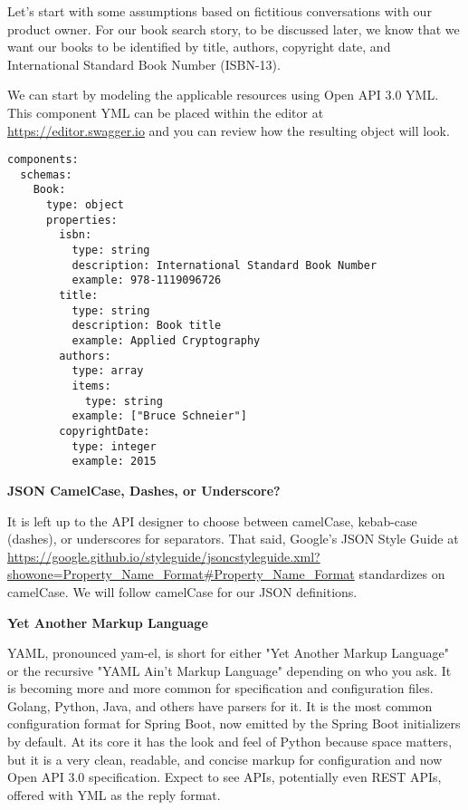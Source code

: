 Let's start with some assumptions based on fictitious conversations with our product owner.  For our book search story, to be discussed later, we know that we want our books to be identified by title, authors, copyright date, and International Standard Book Number (ISBN-13).

\begin{minipage}{\linewidth}
We can start by modeling the applicable resources using Open API 3.0 YML.  This component YML can be placed within the editor at \url{https://editor.swagger.io} and you can review how the resulting object will look.
\begin{code}
\begin{lstlisting}[belowskip=-\baselineskip]
components:
  schemas:
    Book:
      type: object
      properties:
        isbn:
          type: string
          description: International Standard Book Number
          example: 978-1119096726
        title:
          type: string
          description: Book title
          example: Applied Cryptography
        authors:
          type: array
          items:
            type: string
          example: ["Bruce Schneier"]
        copyrightDate:
          type: integer
          example: 2015
\end{lstlisting}
\end{code}
\end{minipage}

\begin{sidebar}
\begin{center}
\textbf{JSON CamelCase, Dashes, or Underscore?}
\end{center}

It is left up to the API designer to choose between camelCase, kebab-case (dashes), or underscores for separators.  That said, Google's JSON Style Guide at \url{https://google.github.io/styleguide/jsoncstyleguide.xml?showone=Property_Name_Format#Property_Name_Format} standardizes on camelCase.  We will follow camelCase for our JSON definitions.

\end{sidebar}

\begin{sidebar}
\begin{center}
\textbf{Yet Another Markup Language}
\end{center}

YAML, pronounced yam-el, is short for either "Yet Another Markup Language" or the recursive "YAML Ain't Markup Language" depending on who you ask.  It is becoming more and more common for specification and configuration files.  Golang, Python, Java, and others have parsers for it.  It is the most common configuration format for Spring Boot, now emitted by the Spring Boot initializers by default.  At its core it has the look and feel of Python because space matters, but it is a very clean, readable, and concise markup for configuration and now Open API 3.0 specification.  Expect to see APIs, potentially even REST APIs, offered with YML as the reply format.

\end{sidebar}

